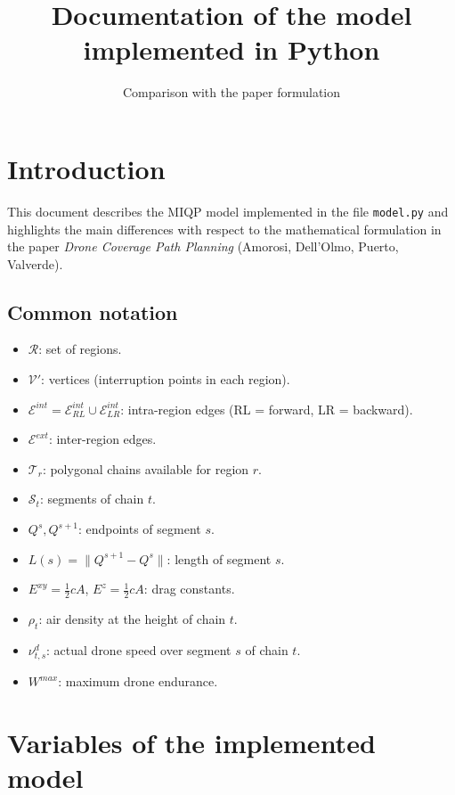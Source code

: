 \documentclass[12pt]{article}
\title{Documentation of the model implemented in Python}
\author{Comparison with the paper formulation}
\date{}
\begin{document}
\maketitle

\section{Introduction}

This document describes the MIQP model implemented in the file \texttt{model.py}
and highlights the main differences with respect to the mathematical formulation
in the paper \emph{Drone Coverage Path Planning} (Amorosi, Dell'Olmo, Puerto, Valverde).

\subsection*{Common notation}

\begin{itemize}
  \item $\mathcal R$: set of regions.
  \item $\mathcal V'$: vertices (interruption points in each region).
  \item $\mathcal E^{int} = \mathcal E_{RL}^{int} \cup \mathcal E_{LR}^{int}$: intra-region edges (RL = forward, LR = backward).
  \item $\mathcal E^{ext}$: inter-region edges.
  \item $\mathcal T_r$: polygonal chains available for region $r$.
  \item $\mathcal S_t$: segments of chain $t$.
  \item $Q^s, Q^{s+1}$: endpoints of segment $s$.
  \item $L(s) = \|Q^{s+1} - Q^s\|$: length of segment $s$.
  \item $E^{xy} = \frac12 c A$, $E^{z} = \frac12 c A$: drag constants.
  \item $\rho_t$: air density at the height of chain $t$.
  \item $\nu_{t,s}^d$: actual drone speed over segment $s$ of chain $t$.
  \item $W^{max}$: maximum drone endurance.
\end{itemize}

\newpage
\section{Variables of the implemented model}
\end{document}
